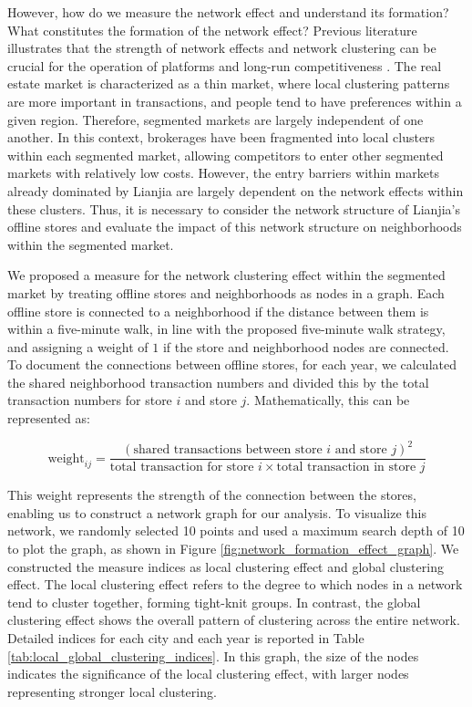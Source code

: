 \documentclass[11pt]{article}
\begin{document}
However, how do we measure the network effect and understand its formation? What constitutes the formation of the network effect? Previous literature illustrates that the strength of network effects and network clustering can be crucial for the operation of platforms and long-run competitiveness \citep{WOS:000454186600016}. The real estate market is characterized as a thin market, where local clustering patterns are more important in transactions, and people tend to have preferences within a given region. Therefore, segmented markets are largely independent of one another. In this context, brokerages have been fragmented into local clusters within each segmented market, allowing competitors to enter other segmented markets with relatively low costs. However, the entry barriers within markets already dominated by Lianjia are largely dependent on the network effects within these clusters. Thus, it is necessary to consider the network structure of Lianjia's offline stores and evaluate the impact of this network structure on neighborhoods within the segmented market.

We proposed a measure for the network clustering effect within the segmented market by treating offline stores and neighborhoods as nodes in a graph. Each offline store is connected to a neighborhood if the distance between them is within a five-minute walk, in line with the proposed five-minute walk strategy, and assigning a weight of $1$ if the store and neighborhood nodes are connected. To document the connections between offline stores, for each year, we calculated the shared neighborhood transaction numbers and divided this by the total transaction numbers for store $i$ and store $j$. Mathematically, this can be represented as:

\begin{equation}
  \text{weight}_{ij} = \frac{(\text{shared transactions between store $i$ and store $j$})^2}{\text{total transaction for store $i$} \times \text{total transaction in store $j$}} \label{eq:weight_between_stores}
\end{equation}

This weight represents the strength of the connection between the stores, enabling us to construct a network graph for our analysis. To visualize this network, we randomly selected 10 points and used a maximum search depth of 10 to plot the graph, as shown in Figure \ref{fig:network_formation_effect_graph}. We constructed the measure indices as local clustering effect and global clustering effect. The local clustering effect refers to the degree to which nodes in a network tend to cluster together, forming tight-knit groups. In contrast, the global clustering effect shows the overall pattern of clustering across the entire network. Detailed indices for each city and each year is reported in Table \ref{tab:local_global_clustering_indices}. In this graph, the size of the nodes indicates the significance of the local clustering effect, with larger nodes representing stronger local clustering. 
\end{document}
